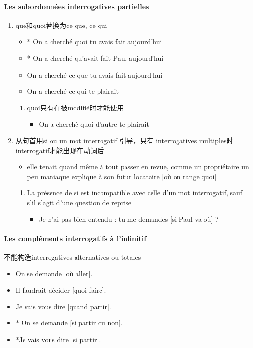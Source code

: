 \documentclass[UTF8]{report}
\begin{document}
\paragraph{Les subordonnées interrogatives partielles}
\begin{enumerate}
    \item que和quoi替换为ce que, ce qui
    \begin{itemize}
        \item * On a cherché quoi tu avais fait aujourd’hui
        \item * On a cherché qu’avait fait Paul aujourd’hui
        \item On a cherché ce que tu avais fait aujourd’hui
        \item On a cherché ce qui te plairait
    \end{itemize}
    \begin{enumerate}
        \item quoi只有在被modifié时才能使用
        \begin{itemize}
            \item On a cherché quoi d’autre te plairait
        \end{itemize}
    \end{enumerate}
    \item 从句首用si ou un mot interrogatif 引导，只有 interrogatives multiples时interrogatif才能出现在动词后
    \begin{itemize}
        \item elle tenait quand même à tout passer en revue, comme un propriétaire un peu maniaque explique à son futur locataire [où on range quoi] 
    \end{itemize}
    \begin{enumerate}
        \item La présence de si est incompatible avec celle d’un mot interrogatif, sauf s’il s’agit d’une question de reprise
        \begin{itemize}
            \item Je n’ai pas bien entendu : tu me demandes [si Paul va où] ?
        \end{itemize}
    \end{enumerate}
\end{enumerate}

\paragraph{Les compléments interrogatifs à l’infinitif}
不能构造interrogatives alternatives ou totales
\begin{itemize}
    \item On se demande [où aller].
    \item Il faudrait décider [quoi faire].
    \item Je vais vous dire [quand partir].
    \item * On se demande [si partir ou non].
    \item *Je vais vous dire [si partir].
\end{itemize}
\end{document}
